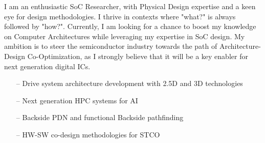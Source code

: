 \documentclass[10pt,a4paper,fancychapters]{altacv}
\begin{document}
%

\begin{fullwidth}
\makecvheader
{}
\justify 
\small{I am an enthusiastic SoC Researcher, with Physical Design expertise and a keen eye for design methodologies. I thrive in contexts where "what?" is always followed by "how?". Currently, I am looking for a chance to boost my knowledge on Computer Architectures while leveraging my expertise in SoC design. My ambition is to steer the semiconductor industry towards the path of  Architecture-Design Co-Optimization, as I strongly believe that it will be a key enabler for next generation digital ICs.}
\end{fullwidth}

%


\setlength{\itemindent}{0.5em}
\begin{itemize}
    \item[--] \small{Drive system architecture development with 2.5D and 3D technologies}
    \item[--] \small{Next generation HPC systems for AI}
\end{itemize}


\begin{itemize}
    \setlength{\itemindent}{0.5em}
    \item[--] \small{Backside PDN and functional Backside pathfinding}
    \item[--] \small{HW-SW co-design methodologies for STCO}
\end{itemize}
\end{document}

